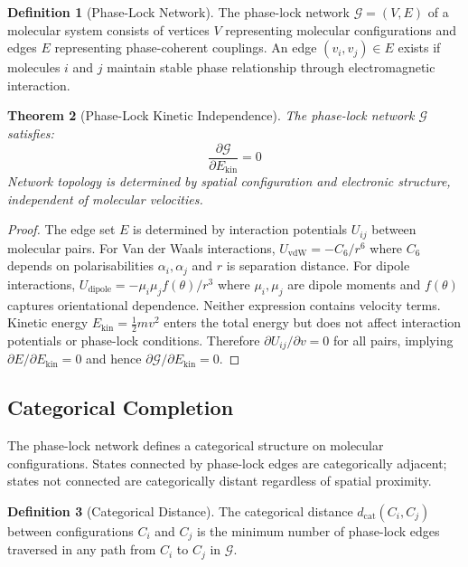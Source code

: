 \documentclass[twocolumn,10pt,a4paper]{article}
\newtheorem{theorem}{Theorem}[section]
\theoremstyle{definition}
\newtheorem{definition}[theorem]{Definition}
\theoremstyle{remark}
\newcommand{\phaselockgraph}{\mathcal{G}}
\newcommand{\dcat}{d_{\mathrm{cat}}}
\begin{document}
\begin{definition}[Phase-Lock Network]
\label{def:phaselock}
The phase-lock network $\phaselockgraph = (V, E)$ of a molecular system consists of vertices $V$ representing molecular configurations and edges $E$ representing phase-coherent couplings. An edge $(v_i, v_j) \in E$ exists if molecules $i$ and $j$ maintain stable phase relationship through electromagnetic interaction.
\end{definition}

\begin{theorem}[Phase-Lock Kinetic Independence]
\label{thm:kinetic_independence}
The phase-lock network $\phaselockgraph$ satisfies:
\begin{equation}
\frac{\partial \phaselockgraph}{\partial E_{\mathrm{kin}}} = 0
\end{equation}
Network topology is determined by spatial configuration and electronic structure, independent of molecular velocities.
\end{theorem}

\begin{proof}
The edge set $E$ is determined by interaction potentials $U_{ij}$ between molecular pairs. For Van der Waals interactions, $U_{\mathrm{vdW}} = -C_6/r^6$ where $C_6$ depends on polarisabilities $\alpha_i, \alpha_j$ and $r$ is separation distance. For dipole interactions, $U_{\mathrm{dipole}} = -\mu_i \mu_j f(\theta)/r^3$ where $\mu_i, \mu_j$ are dipole moments and $f(\theta)$ captures orientational dependence. Neither expression contains velocity terms. Kinetic energy $E_{\mathrm{kin}} = \frac{1}{2}m v^2$ enters the total energy but does not affect interaction potentials or phase-lock conditions. Therefore $\partial U_{ij}/\partial v = 0$ for all pairs, implying $\partial E/\partial E_{\mathrm{kin}} = 0$ and hence $\partial \phaselockgraph/\partial E_{\mathrm{kin}} = 0$.
\end{proof}

\subsection{Categorical Completion}

The phase-lock network defines a categorical structure on molecular configurations. States connected by phase-lock edges are categorically adjacent; states not connected are categorically distant regardless of spatial proximity.

\begin{definition}[Categorical Distance]
\label{def:catdist}
The categorical distance $\dcat(C_i, C_j)$ between configurations $C_i$ and $C_j$ is the minimum number of phase-lock edges traversed in any path from $C_i$ to $C_j$ in $\phaselockgraph$.
\end{definition}
\end{document}
